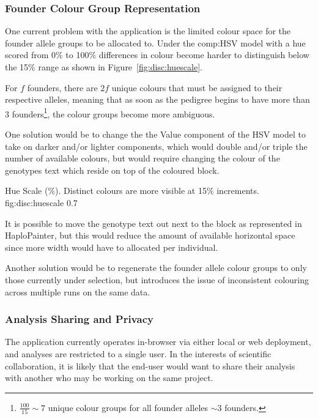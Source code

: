 \subsubsection{Founder Colour Group Representation}
One current problem with the application is the limited colour space for the founder allele groups to be allocated to. Under the \gls{comp:HSV} model with a hue scored from 0\% to 100\% differences in colour become harder to distinguish below the 15\% range as shown in Figure~\ref{fig:disc:huescale}. 

For $f$ founders, there are $2f$ unique colours that must be assigned to their respective alleles, meaning that as soon as the pedigree begins to have more than 3 founders\footnote{$ \frac{100}{15} \sim 7 $ unique colour groups for all founder alleles $ \sim 3$ founders.}, the colour groups become more ambiguous.

One solution would be to change the the Value component of the HSV model to take on darker and/or lighter components, which would double and/or triple the number of available colours, but would require changing the colour of the genotypes text which reside on top of the coloured block. 

{Hue Scale (\%). Distinct colours are more visible at 15\% increments.}
{fig:disc:huescale}
{0.7}{}

It is possible to move the genotype text out next to the block as represented in HaploPainter, but this would reduce the amount of available horizontal space since more width would have to allocated per individual.

Another solution would be to regenerate the founder allele colour groups to only those currently under selection, but introduces the issue of inconsistent colouring across multiple runs on the same data.


\subsubsection{Analysis Sharing and Privacy}

The application currently operates in-browser via either local or web deployment, and analyses are restricted to a single user. In the interests of scientific collaboration, it is likely that the end-user would want to share their analysis with another who may be working on the same project.

